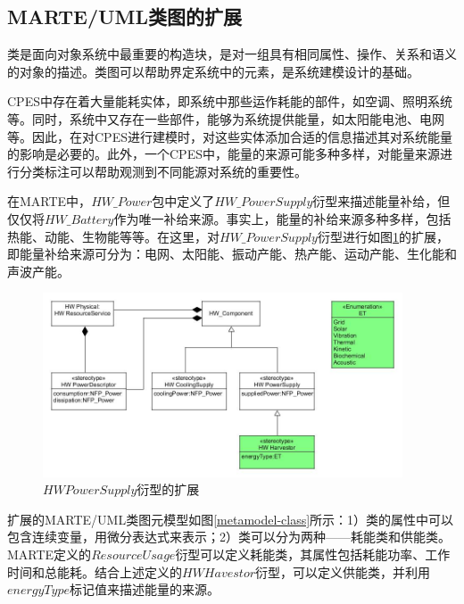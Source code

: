 \subsection{MARTE/UML类图的扩展}
	类是面向对象系统中最重要的构造块，是对一组具有相同属性、操作、关系和语义的对象的描述。类图可以帮助界定系统中的元素，是系统建模设计的基础。
	
	CPES中存在着大量能耗实体，即系统中那些运作耗能的部件，如空调、照明系统等。同时，系统中又存在一些部件，能够为系统提供能量，如太阳能电池、电网等。因此，在对CPES进行建模时，对这些实体添加合适的信息描述其对系统能量的影响是必要的。此外，一个CPES中，能量的来源可能多种多样，对能量来源进行分类标注可以帮助观测到不同能源对系统的重要性。
	
	在MARTE中，$HW\_Power$包中定义了$HW\_PowerSupply$衍型来描述能量补给，但仅仅将$HW\_Battery$作为唯一补给来源。事实上，能量的补给来源多种多样，包括热能、动能、生物能等等。在这里，对$HW\_PowerSupply$衍型进行如图\ref{harvestor}的扩展，即能量补给来源可分为：电网、太阳能、振动产能、热产能、运动产能、生化能和声波产能。
	
	\begin{figure}[!t]
	\centering
	\includegraphics[width=4.2in]{harvestor.jpg}
	\caption{$HW PowerSupply$衍型的扩展}
	\label{harvestor}
	\end{figure}
	
	
	扩展的MARTE/UML类图元模型如图\ref{metamodel-class}所示：1）类的属性中可以包含连续变量，用微分表达式来表示；2）类可以分为两种——耗能类和供能类。MARTE定义的$ResourceUsage$衍型可以定义耗能类，其属性包括耗能功率、工作时间和总能耗。结合上述定义的$HW Havestor$衍型，可以定义供能类，并利用$energyType$标记值来描述能量的来源。
	

